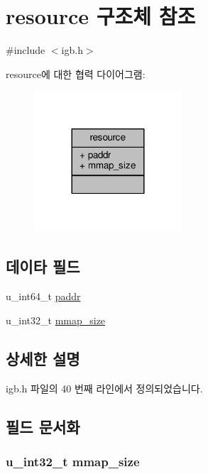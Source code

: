 \hypertarget{structresource}{}\section{resource 구조체 참조}
\label{structresource}


{\ttfamily \#include $<$igb.\+h$>$}



resource에 대한 협력 다이어그램\+:
\nopagebreak
\begin{figure}[H]
\begin{center}
\leavevmode
\includegraphics[width=156pt]{structresource__coll__graph}
\end{center}
\end{figure}
\subsection*{데이타 필드}
\begin{DoxyCompactItemize}
\item 
u\+\_\+int64\+\_\+t \hyperlink{structresource_ac1f7f4ff311d1bc193e88d7cd3230bc6}{paddr}
\item 
u\+\_\+int32\+\_\+t \hyperlink{structresource_a83be2978ea6cb76ae7b9be1c9819e0fe}{mmap\+\_\+size}
\end{DoxyCompactItemize}


\subsection{상세한 설명}


igb.\+h 파일의 40 번째 라인에서 정의되었습니다.



\subsection{필드 문서화}
\subsubsection[{\texorpdfstring{mmap\+\_\+size}{mmap_size}}]{\setlength{\rightskip}{0pt plus 5cm}u\+\_\+int32\+\_\+t mmap\+\_\+size}\hypertarget{structresource_a83be2978ea6cb76ae7b9be1c9819e0fe}{}\label{structresource_a83be2978ea6cb76ae7b9be1c9819e0fe}


